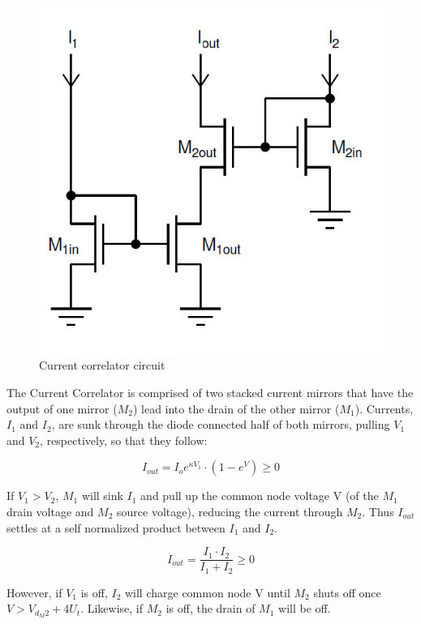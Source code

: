 \begin{figure}[htbp]
  \centering
  \includegraphics[scale=0.7]{pics/Current_correlator_circuit.png}
  \caption{Current correlator circuit}
  \label{fig:Current_correlator_circuit}
\end{figure}

The Current Correlator is comprised of two stacked current mirrors that have the output of one mirror ($M_2$) lead into the drain of the other mirror ($M_1$). Currents, $I_1$ and $I_2$, are sunk through the diode connected half of both mirrors, pulling $V_1$ and $V_2$, respectively, so that they follow: 

\begin{equation}
I_{out} = I_o e^{\kappa V_1}\cdot(1-e^{V}) \geq 0
\end{equation}


If $V_1 > V_2$, $M_1$ will sink $I_1$ and pull up the common node voltage V (of the $M_1$ drain voltage and $M_2$ source voltage), reducing the current through $M_2$. Thus $I_{out}$ settles at a self normalized product between $I_1$ and $I_2$. 

\begin{equation}
I_{out} = \frac{I_1 \cdot I_2}{I_1+I_2} \geq 0
\end{equation}

However, if $V_1$ is off, $I_2$ will charge common node V until $M_2$ shuts off once $V>V_{d_M2}+4U_t$. Likewise, if $M_2$ is off, the drain of $M_1$ will be off. 

